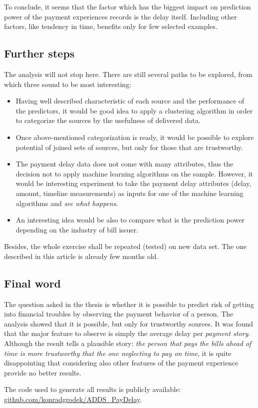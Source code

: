 \documentclass{article}
\begin{document}
\par To conclude, it seems that the factor which has the biggest impact on prediction power of the payment experiences records is the delay itself.
Including other factors, like tendency in time, benefits only for few selected examples.

\subsection{Further steps}

The analysis will not stop here.
There are still several paths to be explored, from which three sound to be most interesting:
\begin{itemize}
    \item Having well described characteristic of each source and the performance of the predictors, it would be good idea to apply a clustering algorithm in order to categorize the sources by the usefulness of delivered data.
    \item Once above-mentioned categorization is ready, it would be possible to explore potential of joined sets of sources, but only for those that are trustworthy.
    \item The payment delay data does not come with many attributes, thus the decision not to apply machine learning algorithms on the sample. However, it would be interesting experiment to take the payment delay attributes (delay, amount, timeline measurements) as inputs for one of the machine learning algorithms and \textit{see what happens}.
    \item An interesting idea would be also to compare what is the prediction power depending on the industry of bill issuer.
\end{itemize}

Besides, the whole exercise shall be repeated (tested) on new data set.
The one described in this article is already few months old.

\subsection{Final word}

The question asked in the thesis is whether it is possible to predict risk of getting into financial troubles by observing the payment behavior of a person.
The analysis showed that it is possible, but only for trustworthy sources.
It was found that the major feature to observe is simply the average delay per \textit{payment story}.
Although the result tells a plausible story: \textit{the person that pays the bills ahead of time is more trustworthy that the one neglecting to pay on time},
it is quite disappointing that considering also other features of the payment experience provide no better results.

\par The code used to generate all results is publicly available: \href{https://github.com/konradgrodek/ADDS_PayDelay}{github.com/konradgrodek/ADDS_PayDelay}.

\printbibliography
\end{document}
